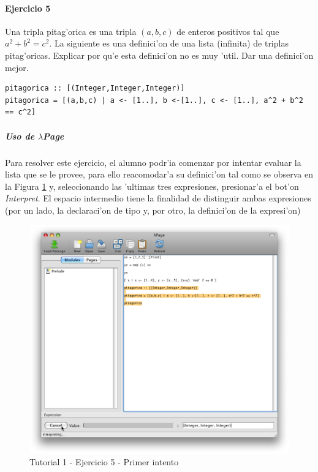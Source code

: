 \documentclass[a4paper]{article}
\newcommand{\hpage}{\textbf{\textsl{$\lambda$Page}}}
\begin{document}
\paragraph{Ejercicio 5}Una tripla pitag'orica es una tripla $(a,b,c)$ de enteros positivos tal que $a^{2} + b^{2} = c^{2}$.  La siguiente es una definici'on de una lista (infinita) de triplas pitag'oricas.  Explicar por qu'e esta definici'on no es muy 'util.  Dar una definici'on mejor.
\begin{center}\begin{lstlisting}
pitagorica :: [(Integer,Integer,Integer)] 
pitagorica = [(a,b,c) | a <- [1..], b <-[1..], c <- [1..], a^2 + b^2 == c^2] 
\end{lstlisting}\end{center}
\subparagraph{Uso de \hpage}Para resolver este ejercicio, el alumno podr'ia comenzar por intentar evaluar la lista que se le provee, para ello reacomodar'a su definici'on tal como se observa en la Figura \ref{tut103} y, seleccionando las 'ultimas tres expresiones, presionar'a el bot'on \textsl{Interpret}.  El espacio intermedio tiene la finalidad de distinguir ambas expresiones (por un lado, la declaraci'on de tipo y, por otro, la definici'on de la expresi'on)
\begin{figure}[hp]
	\begin{center}
        	\includegraphics[width=.75\textwidth]{pictures/tut1/03}
		\caption{Tutorial 1 - Ejercicio 5 - Primer intento}
		\label{tut103}
	\end{center}
\end{figure}
\end{document}
